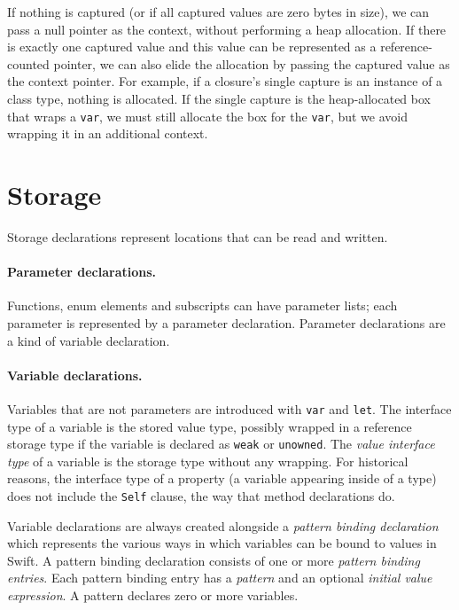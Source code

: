 \documentclass[../generics]{subfiles}
\begin{document}
If nothing is captured (or if all captured values are zero bytes in size), we can pass a null pointer as the context, without performing a heap allocation. If there is exactly one captured value and this value can be represented as a reference-counted pointer, we can also elide the allocation by passing the captured value as the context pointer. For example, if a closure's single capture is an instance of a class type, nothing is allocated. If the single capture is the heap-allocated box that wraps a \texttt{var}, we must still allocate the box for the \texttt{var}, but we avoid wrapping it in an additional context.

\section{Storage}\label{other decls}

Storage declarations represent locations that can be read and written.

\paragraph{Parameter declarations.} Functions, enum elements and subscripts can have parameter lists; each parameter is represented by a parameter declaration. Parameter declarations are a kind of variable declaration.

\paragraph{Variable declarations.} Variables that are not parameters are introduced with \texttt{var} and \texttt{let}. The interface type of a variable is the stored value type, possibly wrapped in a reference storage type if the variable is declared as \texttt{weak} or \texttt{unowned}. The \emph{value interface type} of a variable is the storage type without any wrapping. For historical reasons, the interface type of a property (a variable appearing inside of a type) does not include the \texttt{Self} clause, the way that method declarations do.

Variable declarations are always created alongside a \emph{pattern binding declaration} which represents the various ways in which variables can be bound to values in Swift. A pattern binding declaration consists of one or more \emph{pattern binding entries}. Each pattern binding entry has a \emph{pattern} and an optional \emph{initial value expression}. A pattern declares zero or more variables.
\end{document}
